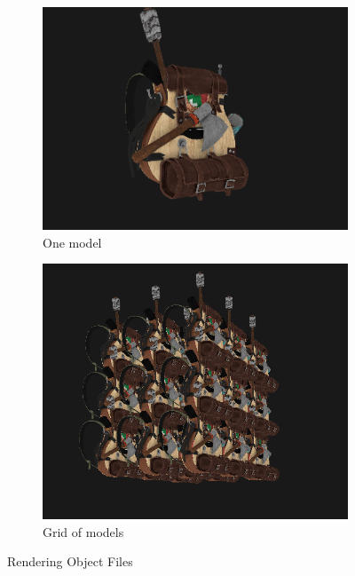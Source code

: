 \documentclass[a4paper, 12pt]{article}
\begin{document}
    \begin{figure}[H]
        \centering
        \begin{subfigure}[b]{0.45\textwidth}
            \centering
            \includegraphics[width=\textwidth]{renderingModels.png}
            \caption{One model}
        \end{subfigure}
        \hfill
        \begin{subfigure}[b]{0.45\textwidth}
            \centering
            \includegraphics[width=\textwidth]{gridOfModels.png}
            \caption{Grid of models}
        \end{subfigure}
        \caption{Rendering Object Files}
    \end{figure}
\end{document}
